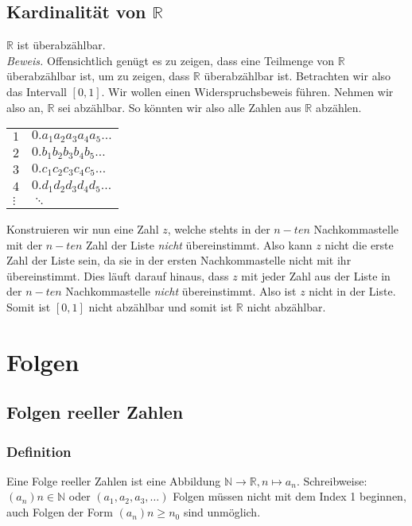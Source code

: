 \documentclass{scrreprt}
\newenvironment{proof}{\emph{\\Beweis.}}{}
\newcommand{\NN}{\mathbb{N}}
\newcommand{\RR}{\mathbb{R}}
\begin{document}
    \section{Kardinalität von $\RR$}
    $\RR$ ist überabzählbar.
    \begin{proof}
        Offensichtlich genügt es zu zeigen, dass eine Teilmenge von $\RR$ überabzählbar ist, um zu zeigen, dass $\RR$ überabzählbar ist. Betrachten wir also das Intervall $[0,1]$. Wir wollen einen Widerspruchsbeweis führen. Nehmen wir also an, $\RR$ sei abzählbar. So könnten wir also alle Zahlen aus $\RR$ abzählen.\\
        \begin{center}
            \begin{tabular}{ll}
                $1$ & $0.a_1 a_2 a_3 a_4 a_5 \dots$\\
                $2$ & $0.b_1 b_2 b_3 b_4 b_5 \dots$\\
                $3$ & $0.c_1 c_2 c_3 c_4 c_5 \dots$\\
                $4$ & $0.d_1 d_2 d_3 d_4 d_5 \dots$\\
                $\vdots$ & $\ddots$  
            \end{tabular}
        \end{center}
        Konstruieren wir nun eine Zahl $z$, welche stehts in der $n-ten$ Nachkommastelle mit der $n-ten$ Zahl der Liste \emph{nicht} übereinstimmt. Also kann $z$ nicht die erste Zahl der Liste sein, da sie in der ersten Nachkommastelle nicht mit ihr übereinstimmt. Dies läuft darauf hinaus, dass $z$ mit jeder Zahl aus der Liste in der $n-ten$ Nachkommastelle \emph{nicht} übereinstimmt. Also ist $z$ nicht in der Liste. Somit ist $[0,1]$ nicht abzählbar und somit ist $\RR$ nicht abzählbar.
    \end{proof}
    
    \chapter{Folgen}
    \section{Folgen reeller Zahlen}
        \subsection{Definition}
        Eine Folge reeller Zahlen ist eine Abbildung $\NN \longrightarrow \RR , n \mapsto a_n $. Schreibweise: $ (a_n ) n \in \NN $ oder $ (a_1 , a_2 ,a_3 , \dots )$
        Folgen müssen nicht mit dem Index 1 beginnen, auch Folgen der Form $(a_n ) n \geq n_0 $ sind unmöglich.
        
\end{document}
